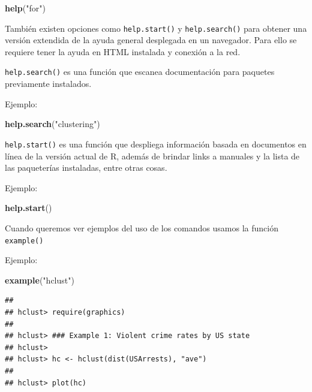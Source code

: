 \documentclass[
]{book}
\newenvironment{Shaded}{\begin{snugshade}}{\end{snugshade}}
\newcommand{\FunctionTok}[1]{\textcolor[rgb]{0.13,0.29,0.53}{\textbf{#1}}}
\newcommand{\NormalTok}[1]{#1}
\newcommand{\StringTok}[1]{\textcolor[rgb]{0.31,0.60,0.02}{#1}}
\begin{document}
\begin{Shaded}
\begin{Highlighting}[]
\FunctionTok{help}\NormalTok{(}\StringTok{"for"}\NormalTok{)}
\end{Highlighting}
\end{Shaded}

También existen opciones como \texttt{help.start()} y \texttt{help.search()} para obtener una versión extendida de la ayuda general desplegada en un navegador. Para ello se requiere tener la ayuda en HTML instalada y conexión a la red.

\texttt{help.search()} es una función que escanea documentación para paquetes previamente instalados.

Ejemplo:

\begin{Shaded}
\begin{Highlighting}[]
\FunctionTok{help.search}\NormalTok{(}\StringTok{"clustering"}\NormalTok{)}
\end{Highlighting}
\end{Shaded}

\texttt{help.start()} es una función que despliega información basada en documentos en línea de la versión actual de R, además de brindar links a manuales y la lista de las paqueterías instaladas, entre otras cosas.

Ejemplo:

\begin{Shaded}
\begin{Highlighting}[]
\FunctionTok{help.start}\NormalTok{()}
\end{Highlighting}
\end{Shaded}

Cuando queremos ver ejemplos del uso de los comandos usamos la función \texttt{example()}

Ejemplo:

\begin{Shaded}
\begin{Highlighting}[]
\FunctionTok{example}\NormalTok{(}\StringTok{"hclust"}\NormalTok{)}
\end{Highlighting}
\end{Shaded}

\begin{verbatim}
## 
## hclust> require(graphics)
## 
## hclust> ### Example 1: Violent crime rates by US state
## hclust> 
## hclust> hc <- hclust(dist(USArrests), "ave")
## 
## hclust> plot(hc)
\end{verbatim}
\end{document}
